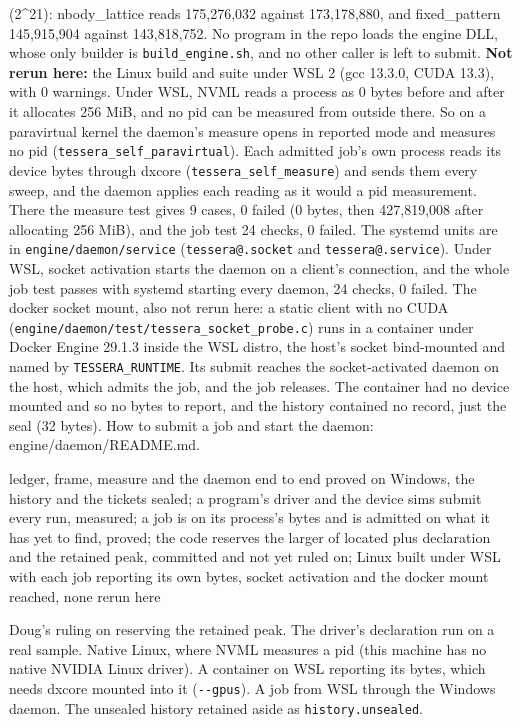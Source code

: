 \begin{description}
(2\textasciicircum{}21): nbody\_\allowbreak{}lattice reads 175,276,032 against 173,178,880, and fixed\_\allowbreak{}pattern 145,915,904 against 143,818,752. No program in the repo loads the engine DLL, whose only builder is \texttt{build\_\allowbreak{}engine.\allowbreak{}sh}, and no other caller is left to submit. \textbf{Not rerun here:} the Linux build and suite under WSL 2 (gcc 13.3.0, CUDA 13.3), with 0 warnings. Under WSL, NVML reads a process as 0 bytes before and after it allocates 256 MiB, and no pid can be measured from outside there. So on a paravirtual kernel the daemon's measure opens in reported mode and measures no pid (\texttt{tessera\_\allowbreak{}self\_\allowbreak{}paravirtual}). Each admitted job's own process reads its device bytes through dxcore (\texttt{tessera\_\allowbreak{}self\_\allowbreak{}measure}) and sends them every sweep, and the daemon applies each reading as it would a pid measurement. There the measure test gives 9 cases, 0 failed (0 bytes, then 427,819,008 after allocating 256 MiB), and the job test 24 checks, 0 failed. The systemd units are in \texttt{engine/\allowbreak{}daemon/\allowbreak{}service} (\texttt{tessera@.\allowbreak{}socket} and \texttt{tessera@.\allowbreak{}service}). Under WSL, socket activation starts the daemon on a client's connection, and the whole job test passes with systemd starting every daemon, 24 checks, 0 failed. The docker socket mount, also not rerun here: a static client with no CUDA (\texttt{engine/\allowbreak{}daemon/\allowbreak{}test/\allowbreak{}tessera\_\allowbreak{}socket\_\allowbreak{}probe.\allowbreak{}c}) runs in a container under Docker Engine 29.1.3 inside the WSL distro, the host's socket bind-mounted and named by \texttt{TESSERA\_\allowbreak{}RUNTIME}. Its submit reaches the socket-activated daemon on the host, which admits the job, and the job releases. The container had no device mounted and so no bytes to report, and the history contained no record, just the seal (32 bytes). How to submit a job and start the daemon: engine/daemon/README.md.
\item[{status}] ledger, frame, measure and the daemon end to end proved on Windows, the history and the tickets sealed; a program's driver and the device sims submit every run, measured; a job is on its process's bytes and is admitted on what it has yet to find, proved; the code reserves the larger of located plus declaration and the retained peak, committed and not yet ruled on; Linux built under WSL with each job reporting its own bytes, socket activation and the docker mount reached, none rerun here
\item[{next}] Doug's ruling on reserving the retained peak. The driver's declaration run on a real sample. Native Linux, where NVML measures a pid (this machine has no native NVIDIA Linux driver). A container on WSL reporting its bytes, which needs dxcore mounted into it (\texttt{-\allowbreak{}-\allowbreak{}gpus}). A job from WSL through the Windows daemon. The unsealed history retained aside as \texttt{history.\allowbreak{}unsealed}.
\end{description}

